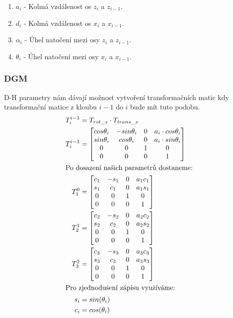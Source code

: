 \documentclass{article}
\begin{document}
					\begin{enumerate}
						\item \(a_i\) - Kolmá vzdálenost os \(z_i\) a \(z_{i-1}\).
						\item \(d_i\) - Kolmá vzdálenost os \(x_{i}\) a \(x_{i-1}\). 
						\item \(\alpha_i\) - Úhel natočení mezi osy \(z_i\) a \(z_{i-1}\).
						\item \(\theta_i\) - Úhel natočení mezi osy \(x_i\) a \(x_{i-1}\).
					\end{enumerate}
			\subsubsection{DGM}
	
				D-H parametry nám dávají možnost vytvoření transformačních matic kdy transformační matice z kloubu \(i-1\) do \(i\) bude mít tuto podobu.
					\begin{align}
						T^{i-1}_i &= T_{rot\_z} \cdot T_{trans\_x} \\
						T^{i-1}_i &= \begin{bmatrix}
							cos\theta_i & -sin\theta_i & 0 & a_i \cdot cos\theta_i \\
							sin\theta_i & cos\theta_i & 0 & a_i \cdot sin\theta_i \\
							0 & 0 & 1 & 0 \\
							0 & 0 & 0 & 1 \\
						\end{bmatrix} \\
						\intertext{Po dosazení našich parametrů dostaneme:}
						T^0_1 &= \begin{bmatrix}
							c_1 & -s_1 & 0 & a_1c_1 \\
							s_1 & c_1 & 0 & a_1s_1 \\
							0 & 0 & 1 & 0 \\
							0 & 0 & 0 & 1 \\
						\end{bmatrix} \label{eq:dgm:t_individual} \\
						T^1_2 &= \begin{bmatrix}
							c_2 & -s_2 & 0 & a_2c_2 \\
							s_2 & c_2 & 0 & a_2s_2 \\
							0 & 0 & 1 & 0 \\
							0 & 0 & 0 & 1 \\
						\end{bmatrix} \nonumber \\
						T^2_3 &= \begin{bmatrix}
							c_3 & -s_3 & 0 & a_3c_3 \\
							s_3 & c_3 & 0 & a_3s_3 \\
							0 & 0 & 1 & 0 \\
							0 & 0 & 0 & 1 \\
						\end{bmatrix} \nonumber \\
						\intertext{Pro zjednodušení zápisu využíváme:}
						s_i &= sin(\theta_i) \\
						c_i &= cos(\theta_i) \nonumber
					\end{align} 
\end{document}
